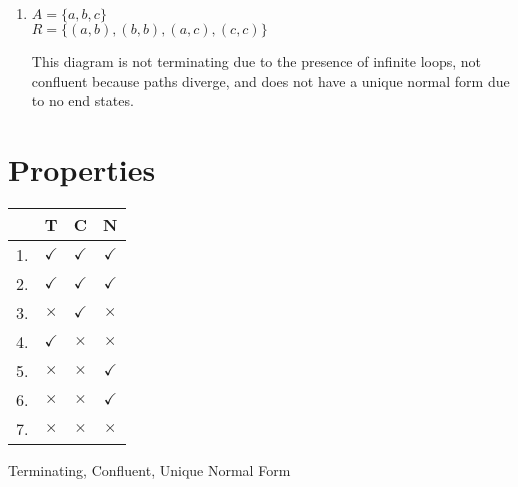 \documentclass{article}
\begin{document}
\begin{enumerate}
\vspace{4em}

    \item $A = \{ a, b, c \}$ \\
    \hspace*{1em} $R = \{ (a,b), (b,b), (a,c), (c,c) \}$
    \begin{center}
    \end{center}
    This diagram is not terminating due to the presence of infinite loops, not confluent because paths diverge, and does not have a unique normal form due to no end states.

\vspace{4em}

\end{enumerate}

\section*{Properties}
\begin{tabular}{c c c c}
     & T & C & N \\ \hline
    1. & $\checkmark$ & $\checkmark$ & $\checkmark$ \\
    2. & $\checkmark$ & $\checkmark$ & $\checkmark$ \\
    3. & $\times$ & $\checkmark$ & $\times$ \\
    4. & $\checkmark$ & $\times$ & $\times$ \\
    5. & $\times$ & $\times$ & $\checkmark$ \\
    6. & $\times$ & $\times$ & $\checkmark$ \\
    7. & $\times$ & $\times$ & $\times$ \\
\end{tabular}

\vspace{4em}
\noindent Terminating, Confluent, Unique Normal Form
\end{document}
